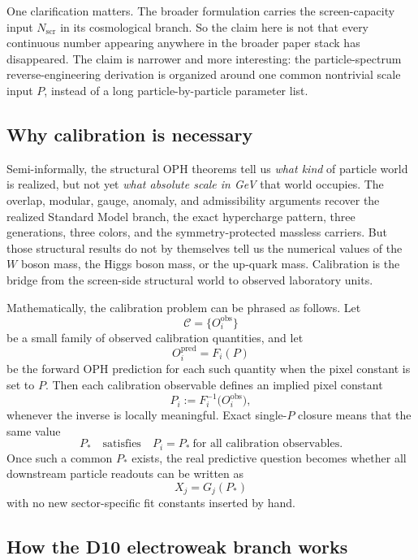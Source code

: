\documentclass[11pt]{article}
\begin{document}
One clarification matters. The broader formulation carries the
screen-capacity input \(N_{\mathrm{scr}}\) in its cosmological branch. So the claim here is
not that every continuous number appearing anywhere in the broader paper stack has disappeared. The
claim is narrower and more interesting: the particle-spectrum reverse-engineering derivation is
organized around one common nontrivial scale input \(P\), instead of a long particle-by-particle
parameter list.

\subsection{Why calibration is necessary}

Semi-informally, the structural OPH theorems tell us \emph{what kind} of particle world is
realized, but not yet \emph{what absolute scale in GeV} that world occupies. The overlap,
modular, gauge, anomaly, and admissibility arguments recover the realized Standard Model branch,
the exact hypercharge pattern, three generations, three colors, and the symmetry-protected
massless carriers. But those structural results do not by themselves tell us the numerical values
of the \(W\) boson mass, the Higgs boson mass, or the up-quark mass. Calibration is the bridge
from the screen-side structural world to observed laboratory units.

Mathematically, the calibration problem can be phrased as follows. Let
\[
\mathcal C=\{O_i^{\mathrm{obs}}\}
\]
be a small family of observed calibration quantities, and let
\[
O_i^{\mathrm{pred}} = F_i(P)
\]
be the forward OPH prediction for each such quantity when the pixel constant is set to \(P\).
Then each calibration observable defines an implied pixel constant
\[
P_i := F_i^{-1}\!\bigl(O_i^{\mathrm{obs}}\bigr),
\]
whenever the inverse is locally meaningful. Exact single-\(P\) closure means that the same value
\[
P_* \quad \text{satisfies} \quad P_i=P_* \ \text{for all calibration observables}.
\]
Once such a common \(P_*\) exists, the real predictive question becomes whether all downstream
particle readouts can be written as
\[
X_j = G_j(P_*)
\]
with no new sector-specific fit constants inserted by hand.

\subsection{How the D10 electroweak branch works}
\end{document}
